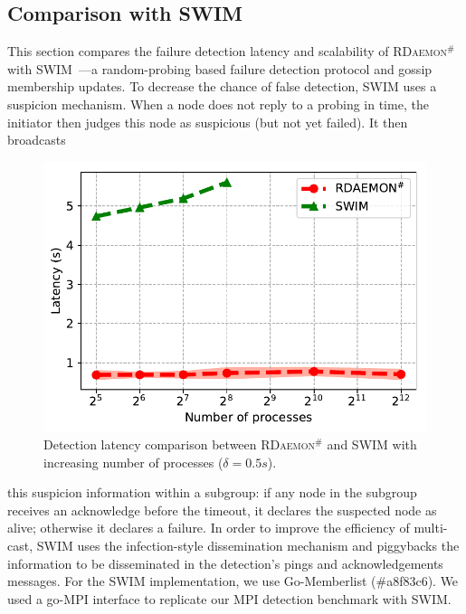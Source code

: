 \documentclass[5p,times,twocolumn]{elsarticle}
\newcommand{\mpi}[0]{\textsc{MPI}\xspace}
\newcommand{\ourwork}[0]{\textsc{RDaemon}\ensuremath{^\#}\xspace}
\begin{document}
\subsection{Comparison with SWIM}
This section compares the failure detection latency and scalability of \ourwork with SWIM~\cite{Abhinandan02}---a random-probing based failure detection protocol and gossip membership updates. To decrease
the chance of false detection, SWIM uses a suspicion mechanism. When a node does not reply to a probing in time, the initiator then judges this node as suspicious (but not yet failed). It then broadcasts
\begin{figure}[h]
  \centering
  \includegraphics[width=\linewidth]{Scale_prrte_swim.pdf}\vspace{-1em}
  \caption{Detection latency comparison between \ourwork and SWIM with increasing number of processes ($\delta=0.5s$).}
  \label{fig:scale.swim}
\end{figure}
this suspicion information within a subgroup: if any node in the subgroup receives an acknowledge before the timeout, it declares the suspected node as alive; otherwise it declares a failure. In order to improve the efficiency of multi-cast, SWIM uses the infection-style dissemination mechanism and piggybacks the information to be disseminated in the detection's pings and acknowledgements messages.
For the SWIM implementation, we use Go-Memberlist (\#a8f83c6). We used a go-\mpi interface
to replicate our \mpi detection benchmark with SWIM.
\end{document}
